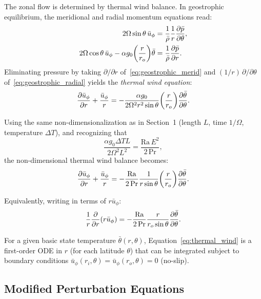 \documentclass[11pt]{article}
\numberwithin{equation}{section}
\begin{document}
The zonal flow is determined by thermal wind balance. In geostrophic equilibrium, the meridional and radial momentum equations read:
\begin{align}
  2\Omega \sin\theta \,\bar{u}_\phi &= \frac{1}{\bar{\rho}} \frac{1}{r} \pdv{\bar{p}}{\theta}, \label{eq:geostrophic_merid} \\
  2\Omega \cos\theta \,\bar{u}_\phi - \alpha g_0 \qty(\frac{r}{r_o}) \bar{\theta} &= \frac{1}{\bar{\rho}} \pdv{\bar{p}}{r}. \label{eq:geostrophic_radial}
\end{align}
Eliminating pressure by taking $\partial/\partial r$ of~\eqref{eq:geostrophic_merid} and $(1/r)\,\partial/\partial\theta$ of~\eqref{eq:geostrophic_radial} yields the \emph{thermal wind equation}:
\begin{equation}
  \pdv{\bar{u}_\phi}{r} + \frac{\bar{u}_\phi}{r} = -\frac{\alpha g_0}{2\Omega^2 r^2 \sin\theta} \qty(\frac{r}{r_o}) \pdv{\bar{\theta}}{\theta}.
  \label{eq:thermal_wind_dim}
\end{equation}

Using the same non-dimensionalization as in Section~1 (length $L$, time $1/\Omega$, temperature $\Delta T$), and recognizing that
\[
  \frac{\alpha g_0 \Delta T L}{2\Omega^2 L^2} = \frac{\mathrm{Ra}\,E^2}{2\,\mathrm{Pr}},
\]
the non-dimensional thermal wind balance becomes:
\begin{equation}
  \pdv{\bar{u}_\phi}{r} + \frac{\bar{u}_\phi}{r} = -\frac{\mathrm{Ra}}{2\,\mathrm{Pr}} \frac{1}{r \sin\theta} \qty(\frac{r}{r_o}) \pdv{\bar{\theta}}{\theta}.
  \label{eq:thermal_wind}
\end{equation}

Equivalently, writing in terms of $r\bar{u}_\phi$:
\begin{equation}
  \frac{1}{r} \pdv{}{r}\qty(r \bar{u}_\phi) = -\frac{\mathrm{Ra}}{2\,\mathrm{Pr}} \frac{r}{r_o \sin\theta} \pdv{\bar{\theta}}{\theta}.
  \label{eq:thermal_wind_alt}
\end{equation}

For a given basic state temperature $\bar{\theta}(r,\theta)$, Equation~\eqref{eq:thermal_wind} is a first-order ODE in $r$ (for each latitude $\theta$) that can be integrated subject to boundary conditions $\bar{u}_\phi(r_i,\theta) = \bar{u}_\phi(r_o,\theta) = 0$ (no-slip).

\subsection{Modified Perturbation Equations}
\end{document}
